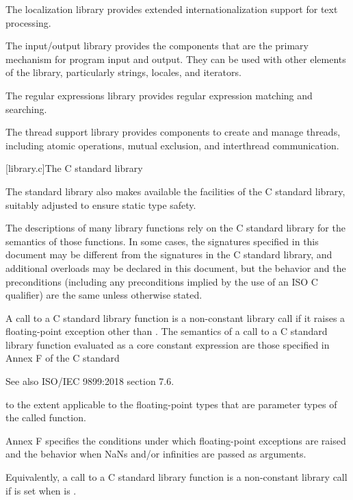 \pnum
The localization library provides extended internationalization
support for text processing.

\pnum
The input/output library provides the
components that are the primary mechanism for \Cpp{} program input and output.
They can be used with other elements of the library, particularly
strings, locales, and iterators.

\pnum
The regular expressions library provides regular expression matching and searching.

\pnum
The thread support library provides components to create
and manage threads,
including atomic operations, mutual exclusion, and interthread communication.

[library.c]{The C standard library}

\pnum
The \Cpp{} standard library also makes available the facilities of the C standard library,
%
suitably adjusted to ensure static type safety.

\pnum
The descriptions of many library functions rely on the C standard library for
the semantics of those functions.
In some cases,
the signatures specified in this document
may be different from the signatures in the C standard library,
and additional overloads may be declared in this document,
but the behavior and the preconditions
(including any preconditions implied by the use of an
ISO C  qualifier)
are the same unless otherwise stated.

\pnum
A call to a C standard library function is
a non-constant library call
if it raises a floating-point exception other than .
The semantics of a call to a C standard library function
evaluated as a core constant expression
are those specified in Annex F of the C standard
\begin{footnote}
See also ISO/IEC 9899:2018 section 7.6.
\end{footnote}
to the extent applicable to the floating-point types
that are parameter types of the called function.
\begin{note}
Annex F specifies
the conditions under which floating-point exceptions are raised and
the behavior when NaNs and/or infinities are passed as arguments.
\end{note}
\begin{note}
Equivalently, a call to a C standard library function is
a non-constant library call
if  is set
when  is .
\end{note}

